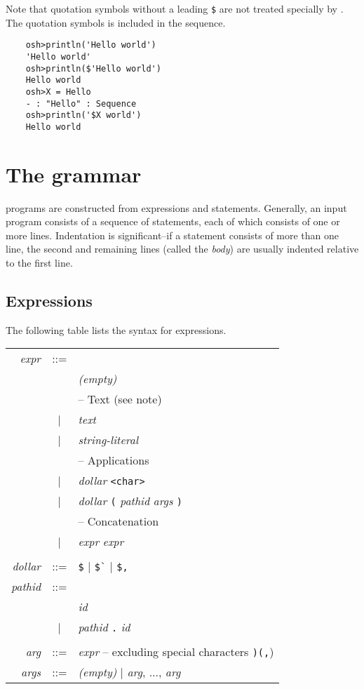 Note that quotation symbols without a leading \verb+$+ are not treated specially by \OMake{}.  The
quotation symbols is included in the sequence.

\begin{verbatim}
    osh>println('Hello world')
    'Hello world'
    osh>println($'Hello world')
    Hello world
    osh>X = Hello
    - : "Hello" : Sequence
    osh>println('$X world')
    Hello world
\end{verbatim}

\section{The \OMake{} grammar}

\OMake{} programs are constructed from expressions and statements.  Generally, an input program
consists of a sequence of statements, each of which consists of one or more lines.  Indentation is
significant--if a statement consists of more than one line, the second and remaining lines (called
the \emph{body}) are usually indented relative to the first line.

\subsection{Expressions}

The following table lists the syntax for expressions.

\begin{tabular}{rcl}
\emph{expr} & ::= &\\
&   & \emph{(empty)}\\
&   & -- Text (see note)\\
& | & \emph{text}\\
& | & \emph{string-literal}\\
&   & -- Applications\\
& | & \emph{dollar} \verb+<char>+\\
& | & \emph{dollar} \verb+(+ \emph{pathid} \emph{args} \verb+)+\\
&   & -- Concatenation\\
& | & \emph{expr} \emph{expr}\\
\\
\emph{dollar} & ::= & \verb+$+ | \verb+$`+ | \verb+$,+
\\
\emph{pathid} & ::= &\\
&   & \emph{id}\\
& | & \emph{pathid} \verb+.+ \emph{id}\\
\\
\emph{arg} & ::= & \emph{expr}   -- excluding special characters \verb+)(,+)\\
\emph{args} & ::= & \emph{(empty)} | \emph{arg}, ..., \emph{arg}
\end{tabular}

